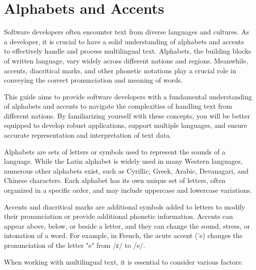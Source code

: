 \chapter{Alphabets and Accents}

Software developers often encounter
text from diverse languages and cultures. As a developer, it is
crucial to have a solid understanding of alphabets and accents to
effectively handle and process multilingual text. Alphabets, the
building blocks of written language, vary widely across different
nations and regions. Meanwhile, accents, diacritical marks, and other
phonetic notations play a crucial role in conveying the correct
pronunciation and meaning of words.  

This guide aims to provide software developers with a fundamental
understanding of alphabets and accents to navigate the complexities of
handling text from different nations. By familiarizing yourself with
these concepts, you will be better equipped to develop robust
applications, support multiple languages, and ensure accurate
representation and interpretation of text data.

Alphabets are sets of letters or symbols used to represent the sounds
of a language. While the Latin alphabet is widely used in many Western
languages, numerous other alphabets exist, such as Cyrillic, Greek,
Arabic, Devanagari, and Chinese characters. Each alphabet has its own
unique set of letters, often organized in a specific order, and may
include uppercase and lowercase variations.

Accents and diacritical marks are additional symbols added to letters
to modify their pronunciation or provide additional phonetic
information. Accents can appear above, below, or beside a letter, and
they can change the sound, stress, or intonation of a word. For
example, in French, the acute accent ('e) changes the pronunciation of
the letter "e" from /ɛ/ to /e/.

When working with multilingual text, it is essential to consider
various factors:

